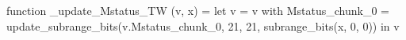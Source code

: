 function _update_Mstatus_TW (v, x) = let v = { v with Mstatus_chunk_0 = update_subrange_bits(v.Mstatus_chunk_0, 21, 21, subrange_bits(x, 0, 0)) } in
  v
